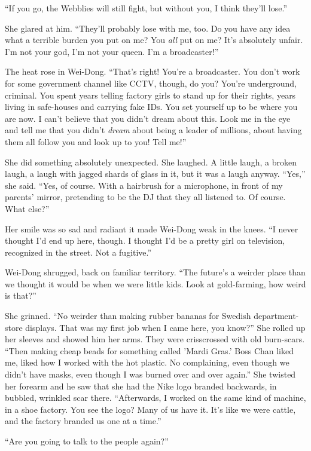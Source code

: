 ``If you go, the Webblies will still fight, but without you, I think
they'll lose.''

She glared at him. ``They'll probably lose with me, too. Do you have
any idea what a terrible burden you put on me? You \emph{all} put
on me? It's absolutely unfair. I'm not your god, I'm not your
queen. I'm a broadcaster!''

The heat rose in Wei-Dong. ``That's right! You're a broadcaster. You
don't work for some government channel like CCTV, though, do you?
You're underground, criminal. You spent years telling factory girls
to stand up for their rights, years living in safe-houses and
carrying fake IDs. You set yourself up to be where you are now. I
can't believe that you didn't dream about this. Look me in the eye
and tell me that you didn't \emph{dream} about being a leader of
millions, about having them all follow you and look up to you! Tell
me!''

She did something absolutely unexpected. She laughed. A little
laugh, a broken laugh, a laugh with jagged shards of glass in it,
but it was a laugh anyway. ``Yes,'' she said. ``Yes, of course. With a
hairbrush for a microphone, in front of my parents' mirror,
pretending to be the DJ that they all listened to. Of course. What
else?''

Her smile was so sad and radiant it made Wei-Dong weak in the
knees. ``I never thought I'd end up here, though. I thought I'd be a
pretty girl on television, recognized in the street. Not a
fugitive.''

Wei-Dong shrugged, back on familiar territory. ``The future's a
weirder place than we thought it would be when we were little kids.
Look at gold-farming, how weird is that?''

She grinned. ``No weirder than making rubber bananas for Swedish
department-store displays. That was my first job when I came here,
you know?'' She rolled up her sleeves and showed him her arms. They
were crisscrossed with old burn-scars. ``Then making cheap beads for
something called 'Mardi Gras.' Boss Chan liked me, liked how I
worked with the hot plastic. No complaining, even though we didn't
have masks, even though I was burned over and over again.'' She
twisted her forearm and he saw that she had the Nike logo branded
backwards, in bubbled, wrinkled scar there. ``Afterwards, I worked
on the same kind of machine, in a shoe factory. You see the logo?
Many of us have it. It's like we were cattle, and the factory
branded us one at a time.''

``Are you going to talk to the people again?''


